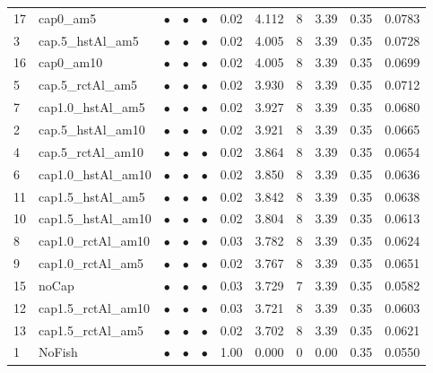 \documentclass[11pt]{book}
\begin{document}
\begin{landscape}
\begin{longtable}[t]{llccccccccc}
17 & cap0\_am5 & $\bullet$ & $\bullet$ & $\bullet$ & 0.02 & 4.112 & 8 & 3.39 & 0.35 & 0.0783\\
3 & cap.5\_hstAl\_am5 & $\bullet$ & $\bullet$ & $\bullet$ & 0.02 & 4.005 & 8 & 3.39 & 0.35 & 0.0728\\
16 & cap0\_am10 & $\bullet$ & $\bullet$ & $\bullet$ & 0.02 & 4.005 & 8 & 3.39 & 0.35 & 0.0699\\
5 & cap.5\_rctAl\_am5 & $\bullet$ & $\bullet$ & $\bullet$ & 0.02 & 3.930 & 8 & 3.39 & 0.35 & 0.0712\\
7 & cap1.0\_hstAl\_am5 & $\bullet$ & $\bullet$ & $\bullet$ & 0.02 & 3.927 & 8 & 3.39 & 0.35 & 0.0680\\
2 & cap.5\_hstAl\_am10 & $\bullet$ & $\bullet$ & $\bullet$ & 0.02 & 3.921 & 8 & 3.39 & 0.35 & 0.0665\\
4 & cap.5\_rctAl\_am10 & $\bullet$ & $\bullet$ & $\bullet$ & 0.02 & 3.864 & 8 & 3.39 & 0.35 & 0.0654\\
6 & cap1.0\_hstAl\_am10 & $\bullet$ & $\bullet$ & $\bullet$ & 0.02 & 3.850 & 8 & 3.39 & 0.35 & 0.0636\\
11 & cap1.5\_hstAl\_am5 & $\bullet$ & $\bullet$ & $\bullet$ & 0.02 & 3.842 & 8 & 3.39 & 0.35 & 0.0638\\
10 & cap1.5\_hstAl\_am10 & $\bullet$ & $\bullet$ & $\bullet$ & 0.02 & 3.804 & 8 & 3.39 & 0.35 & 0.0613\\
8 & cap1.0\_rctAl\_am10 & $\bullet$ & $\bullet$ & $\bullet$ & 0.03 & 3.782 & 8 & 3.39 & 0.35 & 0.0624\\
9 & cap1.0\_rctAl\_am5 & $\bullet$ & $\bullet$ & $\bullet$ & 0.02 & 3.767 & 8 & 3.39 & 0.35 & 0.0651\\
15 & noCap & $\bullet$ & $\bullet$ & $\bullet$ & 0.03 & 3.729 & 7 & 3.39 & 0.35 & 0.0582\\
12 & cap1.5\_rctAl\_am10 & $\bullet$ & $\bullet$ & $\bullet$ & 0.03 & 3.721 & 8 & 3.39 & 0.35 & 0.0603\\
13 & cap1.5\_rctAl\_am5 & $\bullet$ & $\bullet$ & $\bullet$ & 0.02 & 3.702 & 8 & 3.39 & 0.35 & 0.0621\\
1 & NoFish & $\bullet$ & $\bullet$ & $\bullet$ & 1.00 & 0.000 & 0 & 0.00 & 0.35 & 0.0550\\*
\end{longtable}
\end{landscape}
\endgroup{}

\newpage
\end{document}
